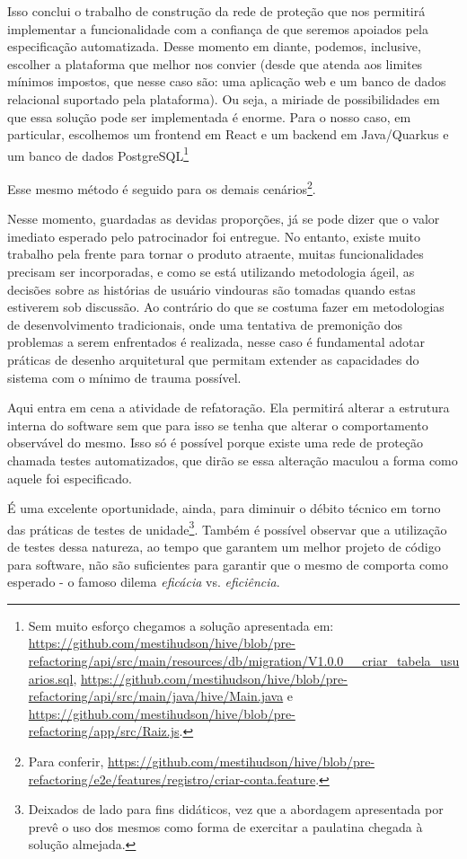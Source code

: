   Isso conclui o trabalho de construção da rede de proteção que nos permitirá implementar a funcionalidade com a confiança de que seremos apoiados pela especificação automatizada. Desse momento em diante, podemos, inclusive, escolher a plataforma que melhor nos convier (desde que atenda aos limites mínimos impostos, que nesse caso são: uma aplicação web e um banco de dados relacional suportado pela plataforma). Ou seja, a miriade de possibilidades em que essa solução pode ser implementada é enorme. Para o nosso caso, em particular, escolhemos um frontend em React e um backend em Java/Quarkus e um banco de dados PostgreSQL\footnote{Sem muito esforço chegamos a solução apresentada em: \url{https://github.com/mestihudson/hive/blob/pre-refactoring/api/src/main/resources/db/migration/V1.0.0__criar_tabela_usuarios.sql}, \url{https://github.com/mestihudson/hive/blob/pre-refactoring/api/src/main/java/hive/Main.java} e \url{https://github.com/mestihudson/hive/blob/pre-refactoring/app/src/Raiz.js}.}

  Esse mesmo método é seguido para os demais cenários\footnote{Para conferir, \url{https://github.com/mestihudson/hive/blob/pre-refactoring/e2e/features/registro/criar-conta.feature}.}.

  Nesse momento, guardadas as devidas proporções, já se pode dizer que o valor imediato esperado pelo patrocinador foi entregue. No entanto, existe muito trabalho pela frente para tornar o produto atraente, muitas funcionalidades precisam ser incorporadas, e como se está utilizando metodologia ágeil, as decisões sobre as histórias de usuário vindouras são tomadas quando estas estiverem sob discussão. Ao contrário do que se costuma fazer em metodologias de desenvolvimento tradicionais, onde uma tentativa de premonição dos problemas a serem enfrentados é realizada, nesse caso é fundamental adotar práticas de desenho arquitetural que permitam extender as capacidades do sistema com o mínimo de trauma possível.

  Aqui entra em cena a atividade de refatoração. Ela permitirá alterar a estrutura interna do software sem que para isso se tenha que alterar o comportamento observável do mesmo. Isso só é possível porque existe uma rede de proteção chamada testes automatizados, que dirão se essa alteração maculou a forma como aquele foi especificado.

  É uma excelente oportunidade, ainda, para diminuir o débito técnico em torno das práticas de testes de unidade\footnote{Deixados de lado para fins didáticos, vez que a abordagem apresentada por  prevê o uso dos mesmos como forma de exercitar a paulatina chegada à solução almejada.}. Também é possível observar que a utilização de testes dessa natureza, ao tempo que garantem um melhor projeto de código para software, não são suficientes para garantir que o mesmo de comporta como esperado - o famoso dilema \emph{eficácia} vs. \emph{eficiência}.

